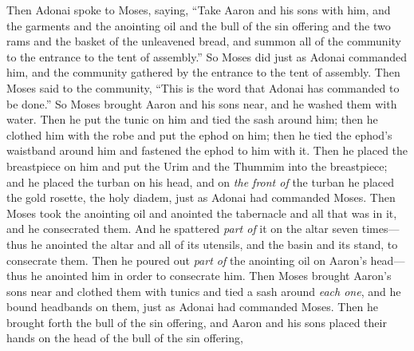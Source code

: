 \begin{biblechapter} %
 Then Adonai spoke to Moses, saying,
\verse “Take Aaron and his sons with him, and the garments and the anointing oil and the bull of the sin offering and the two rams and the basket of the unleavened bread,
\verse and summon all of the community to the entrance to the tent of assembly.”
\verse So Moses did just as Adonai commanded him, and the community gathered by the entrance to the tent of assembly.
\verse Then Moses said to the community, “This is the word that Adonai has commanded to be done.”
\verse So Moses brought Aaron and his sons near, and he washed them with water.
\verse Then he put the tunic on him and tied the sash around him; then he clothed him with the robe and put the ephod on him; then he tied the ephod’s waistband around him and fastened the ephod to him with it.
\verse Then he placed the breastpiece on him and put the Urim and the Thummim into the breastpiece;
\verse and he placed the turban on his head, and on \textit{the front of} the turban he placed the gold rosette, the holy diadem, just as Adonai had commanded Moses.
\verse Then Moses took the anointing oil and anointed the tabernacle and all that was in it, and he consecrated them.
\verse And he spattered \textit{part of} it on the altar seven times—thus he anointed the altar and all of its utensils, and the basin and its stand, to consecrate them.
\verse Then he poured out \textit{part of} the anointing oil on Aaron’s head—thus he anointed him in order to consecrate him.
\verse Then Moses brought Aaron’s sons near and clothed them with tunics and tied a sash around \textit{each one}, and he bound headbands on them, just as Adonai had commanded Moses.
 Then he brought forth the bull of the sin offering, and Aaron and his sons placed their hands on the head of the bull of the sin offering,

\end{biblechapter}
